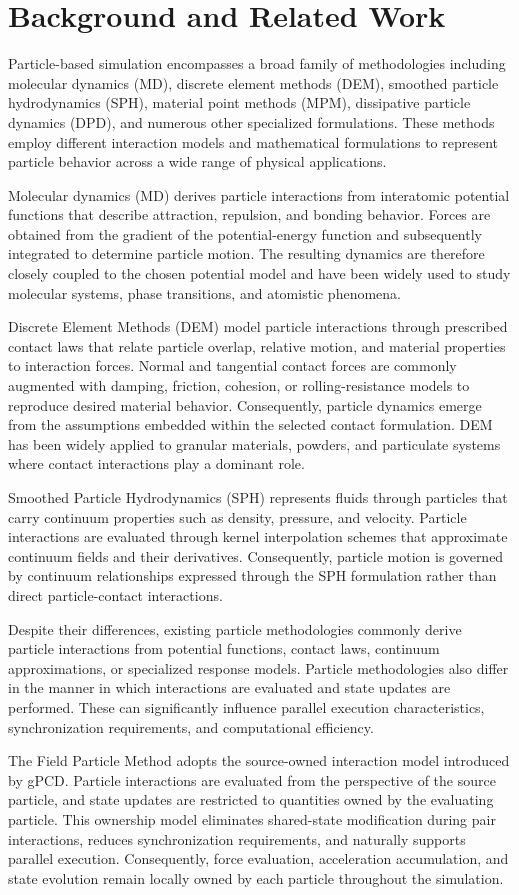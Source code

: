 \section{Background and Related Work}
Particle-based simulation encompasses a broad family of methodologies including molecular dynamics (MD),
discrete element methods (DEM), smoothed particle hydrodynamics (SPH), material point methods (MPM),
dissipative particle dynamics (DPD), and numerous other specialized formulations. These methods employ
different interaction models and mathematical formulations to represent particle behavior across a
wide range of physical applications.

Molecular dynamics (MD) derives particle interactions from interatomic potential functions that describe attraction, repulsion, 
and bonding behavior. Forces are obtained from the gradient of the potential-energy function and subsequently integrated to 
determine particle motion. The resulting dynamics are therefore closely coupled to the chosen potential model and have been 
widely used to study molecular systems, phase transitions, and atomistic phenomena.

Discrete Element Methods (DEM) model particle interactions through prescribed contact laws that relate particle overlap, 
relative motion, and material properties to interaction forces. Normal and tangential contact forces are commonly augmented 
with damping, friction, cohesion, or rolling-resistance models to reproduce desired material behavior. Consequently, particle 
dynamics emerge from the assumptions embedded within the selected contact formulation. DEM has been widely applied to granular 
materials, powders, and particulate systems where contact interactions play a dominant role.

Smoothed Particle Hydrodynamics (SPH) represents fluids through particles that carry continuum properties such as density, 
pressure, and velocity. Particle interactions are evaluated through kernel interpolation schemes that approximate continuum 
fields and their derivatives. Consequently, particle motion is governed by continuum relationships expressed through the SPH 
formulation rather than direct particle-contact interactions.

Despite their differences, existing particle methodologies commonly derive particle interactions from potential functions, 
contact laws, continuum approximations, or specialized response models. Particle methodologies also differ in the manner in
which interactions are evaluated and state updates are performed. These can significantly influence parallel
execution characteristics, synchronization requirements, and computational efficiency.

The Field Particle Method adopts the source-owned interaction model introduced by gPCD. Particle
interactions are evaluated from the perspective of the source particle, and state updates are restricted
to quantities owned by the evaluating particle. This ownership model eliminates shared-state
modification during pair interactions, reduces synchronization requirements, and naturally supports
parallel execution. Consequently, force evaluation, acceleration accumulation, and state evolution
remain locally owned by each particle throughout the simulation.
